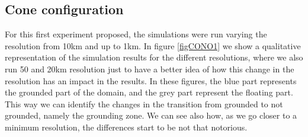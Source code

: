 \documentclass{article}
\begin{document}
\subsection{Cone configuration}

For this first experiment proposed, the simulations were run varying the resolution from 10km and up to 1km. In figure \ref{figCONO1} we show a qualitative representation of the simulation results for the different resolutions, where we also run 50 and 20km resolution just to have a better idea of how this change in the resolution has an impact in the results. In these figures, the blue part represents the grounded part of the domain, and the grey part represent the floating part. This way we can identify the changes in the transition from grounded to not grounded, namely the grounding zone. We can see also how, as we go closer to a minimum resolution, the differences start to be not that notorious. 
\end{document}
